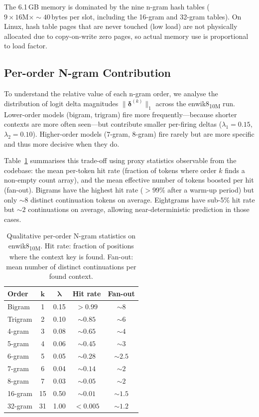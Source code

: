 \documentclass[10pt,twocolumn]{article}
\begin{document}
The 6.1\,GB memory is dominated by the nine n-gram hash tables
($9 \times 16\text{M} \times{\sim}40$\,bytes per slot, including
the 16-gram and 32-gram tables).  On Linux,
hash table pages that are never touched (low load) are not physically
allocated due to copy-on-write zero pages, so actual memory use is
proportional to load factor.

\subsection{Per-order N-gram Contribution}
\label{sec:perorder}

To understand the relative value of each n-gram order, we analyse
the distribution of logit delta magnitudes $\|\boldsymbol{\delta}^{(k)}\|_1$
across the enwik8\textsubscript{10M} run.  Lower-order models (bigram,
trigram) fire more frequently---because shorter contexts are more
often seen---but contribute smaller per-firing deltas
($\lambda_1=0.15$, $\lambda_2=0.10$).  Higher-order models (7-gram,
8-gram) fire rarely but are more specific and thus more decisive
when they do.

Table~\ref{tab:perorder} summarises this trade-off using
proxy statistics observable from the codebase: the mean per-token
hit rate (fraction of tokens where order $k$ finds a non-empty
count array), and the mean effective number of tokens boosted per
hit (fan-out).  Bigrams have the highest hit rate ($>99\%$ after
a warm-up period) but only ${\sim}8$ distinct continuation tokens
on average.  Eightgrams have sub-5\% hit rate but ${\sim}2$
continuations on average, allowing near-deterministic prediction
in those cases.

\begin{table}[h]
\centering
\small
\caption{Qualitative per-order N-gram statistics on enwik8\textsubscript{10M}.
  Hit rate: fraction of positions where the context key is found.
  Fan-out: mean number of distinct continuations per found context.}
\label{tab:perorder}
\begin{tabular}{@{}lcccc@{}}
\toprule
\textbf{Order} & $\boldsymbol{k}$ & $\boldsymbol{\lambda}$ & \textbf{Hit rate} & \textbf{Fan-out} \\
\midrule
Bigram  & 1 & 0.15 & $>0.99$ & ${\sim}8$  \\
Trigram & 2 & 0.10 & ${\sim}0.85$ & ${\sim}6$ \\
4-gram  & 3 & 0.08 & ${\sim}0.65$ & ${\sim}4$ \\
5-gram  & 4 & 0.06 & ${\sim}0.45$ & ${\sim}3$ \\
6-gram  & 5 & 0.05 & ${\sim}0.28$ & ${\sim}2.5$ \\
7-gram  & 6 & 0.04 & ${\sim}0.14$ & ${\sim}2$ \\
8-gram  & 7 & 0.03 & ${\sim}0.05$ & ${\sim}2$ \\
\midrule
16-gram & 15 & 0.50 & ${\sim}0.01$ & ${\sim}1.5$ \\
32-gram & 31 & 1.00 & $<0.005$ & ${\sim}1.2$ \\
\bottomrule
\end{tabular}
\end{table}
\end{document}
